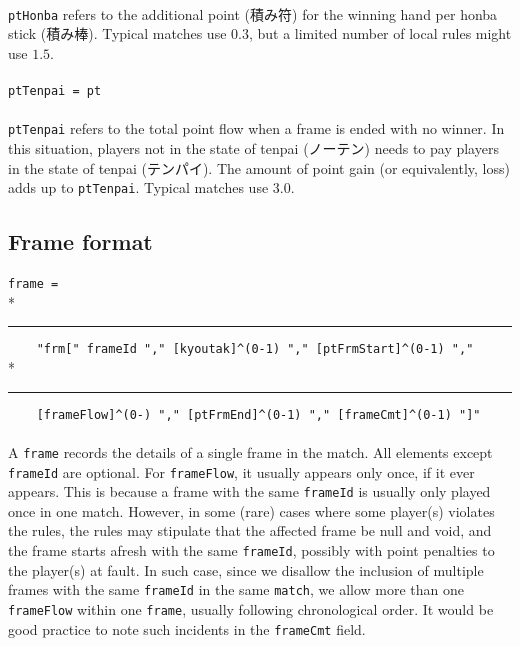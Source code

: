 \documentclass[%
	a4paper%
	,10pt%
	,twoside%
	,notitlepage%
]{article}%
\newcommand*{\ruleSymbol}{\textjapanese{⚠}}%
\newcommand*{\ruleMargin}{\marginpar{\flushright{}\ruleSymbol{}}}%
\newcommand*{\rulePar}{\paragraph*{\ruleMargin{}}}%
\newcommand*{\indentRule}{\rule{10pt}{0pt}}%
\begin{document}
			\paragraph*{}\lstinline/ptHonba/ refers to the additional point (\textjapanese{積み符}) for the winning hand per honba stick (\textjapanese{積み棒}). Typical matches use $0.3$, but a limited number of local rules might use $1.5$. %
			\rulePar{}\lstinline/ptTenpai = pt/%
			\paragraph*{}\lstinline/ptTenpai/ refers to the total point flow when a frame is ended with no winner. In this situation, players not in the state of tenpai (\textjapanese{ノーテン}) needs to pay players in the state of tenpai (\textjapanese{テンパイ}). The amount of point gain (or equivalently, loss) adds up to \lstinline/ptTenpai/. Typical matches use $3.0$. %
	\subsection{Frame format}\label{subsec:frame}%
		\rulePar{}\lstinline/frame = /\\*{}%
		\indentRule{}\lstinline/    "frm[" frameId "," [kyoutak]^(0-1) "," [ptFrmStart]^(0-1) "," /\\*{}%
		\indentRule{}\lstinline/    [frameFlow]^(0-) "," [ptFrmEnd]^(0-1) "," [frameCmt]^(0-1) "]"/%
		\paragraph*{}A \lstinline/frame/ records the details of a single frame in the match. All elements except \lstinline/frameId/ are optional. For \lstinline/frameFlow/, it usually appears only once, if it ever appears. This is because a frame with the same \lstinline/frameId/ is usually only played once in one match. However, in some (rare) cases where some player(s) violates the rules, the rules may stipulate that the affected frame be null and void, and the frame starts afresh with the same \lstinline/frameId/, possibly with point penalties to the player(s) at fault. In such case, since we disallow the inclusion of multiple frames with the same \lstinline/frameId/ in the same \lstinline/match/, we allow more than one \lstinline/frameFlow/ within one \lstinline/frame/, usually following chronological order. It would be good practice to note such incidents in the \lstinline/frameCmt/ field. %
\end{document}
